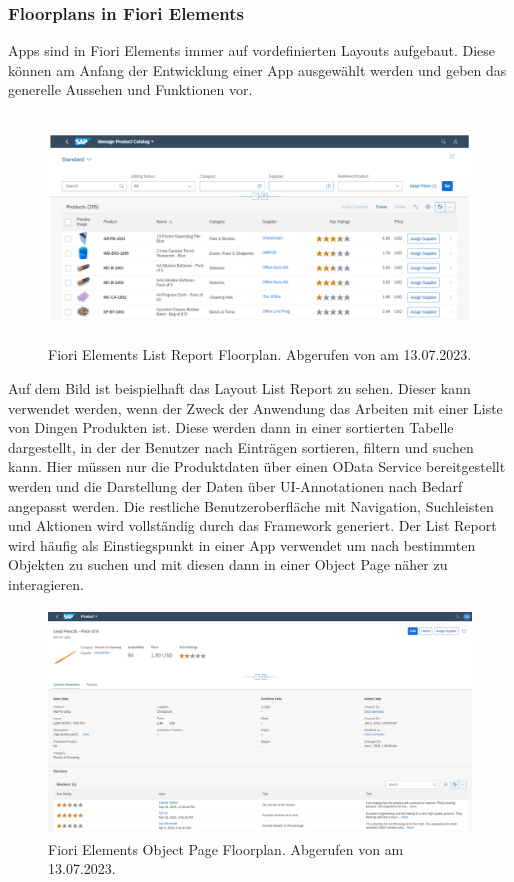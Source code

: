 \subsubsection{Floorplans in Fiori Elements}

Apps sind in Fiori Elements immer auf vordefinierten Layouts aufgebaut. Diese können am Anfang der Entwicklung einer App ausgewählt werden und geben das generelle Aussehen und Funktionen vor.

\begin{figure}[H]
    \centering
    \includegraphics[height=6cm]{Bilder/Fiori_Elements_List_Floorplan.png}
    \caption[Fiori Elements List Report Floorplan]{Fiori Elements List Report Floorplan. Abgerufen von \cite{sap_ui5-docu_2022} am 13.07.2023.}
    \label{fig:iso_norm}
\end{figure}

Auf dem Bild ist beispielhaft das Layout List Report zu sehen. Dieser kann verwendet werden, wenn der Zweck der Anwendung das Arbeiten mit einer Liste von Dingen \zB Produkten ist. Diese werden dann in einer sortierten Tabelle dargestellt, in der der Benutzer nach Einträgen sortieren, filtern und suchen kann. Hier müssen nur die Produktdaten über einen OData Service bereitgestellt werden und die Darstellung der Daten über UI-Annotationen nach Bedarf angepasst werden. Die restliche Benutzeroberfläche mit Navigation, Suchleisten und Aktionen wird vollständig durch das Framework generiert. Der List Report wird häufig als Einstiegspunkt in einer App verwendet um nach bestimmten Objekten zu suchen und mit diesen dann in einer Object Page näher zu interagieren.

\begin{figure}[H]
    \centering
    \includegraphics[height=6cm]{Bilder/Fiori_Elements_Object_Floorplan.png}
    \caption[Fiori Elements Object Page Floorplan]{Fiori Elements Object Page Floorplan. Abgerufen von \cite{sap_ui5-docu_2022} am 13.07.2023.}
    \label{fig:iso_norm}
\end{figure}

